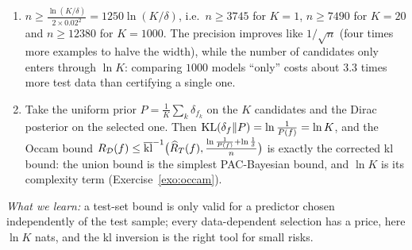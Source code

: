 \documentclass[11pt]{article}
\newcounter{exo}
\newcommand{\exoblock}[1]{\Needspace{10\baselineskip}\bigskip\noindent{\Large\bfseries\color{pbblue}#1}\par\nobreak\smallskip\noindent{\color{pbblue}\rule{\linewidth}{0.6pt}}\par\nobreak}
\begin{document}
\begin{solution}
\begin{enumerate}
      is chosen \emph{with} $T$, among $K$ candidates, precisely because its test error is small. The event on which
      its certificate holds may be the one event that fails (a winner's curse). With the union bound (question~4 of
      Exercise~\ref{exo:concentration}), applying each certificate with $\delta/K$ makes all $K$ of them hold
      simultaneously with probability $\geq1-\delta$, and in particular the one of the selected classifier. For $K=20$:
      $\ln(K/\delta)=\ln400=5.99$, Hoeffding gives $0.05+\sqrt{5.99/400}=0.1724$ and kl gives
      $\klup(0.05,0.0300)=0.1215$. For $K=1000$: $\ln(20000)=9.90$, Hoeffding $0.05+\sqrt{9.90/400}=0.2073$, kl
      $\klup(0.05,0.0495)=0.1484$.
\item $n\geq\frac{\ln(K/\delta)}{2\times0.02^2}=1250\ln(K/\delta)$, i.e.\ $n\geq3745$ for $K=1$, $n\geq7490$ for $K=20$ and
      $n\geq12380$ for $K=1000$. The precision improves like $1/\sqrt n$ (four times more examples to halve the
      width), while the number of candidates only enters through $\ln K$: comparing $1000$ models ``only'' costs
      about $3.3$ times more test data than certifying a single one.
\item Take the uniform prior $P=\frac1K\sum_k\delta_{f_k}$ on the $K$ candidates and the Dirac posterior on the selected one.
      Then $\operatorname{KL}(\delta_f\|P)=\ln\frac1{P(f)}=\ln K$, and the Occam bound $R_{\mathcal{D}}(f)\leq\overline{\operatorname{kl}}^{-1}\big(\widehat R_T(f),\frac{\ln\frac1{P(f)}+\ln\frac1\delta}n\big)$
      is exactly the corrected kl bound: the union bound is the simplest PAC-Bayesian bound, and $\ln K$ is its
      complexity term (Exercise~\ref{exo:occam}).
\end{enumerate}
\emph{What we learn:} a test-set bound is only valid for a predictor chosen independently of the test sample;
every data-dependent selection has a price, here $\ln K$ nats, and the kl inversion is the right tool for small risks.
\end{solution}

\exoblock{Part II -- Core exercises}
\end{document}
